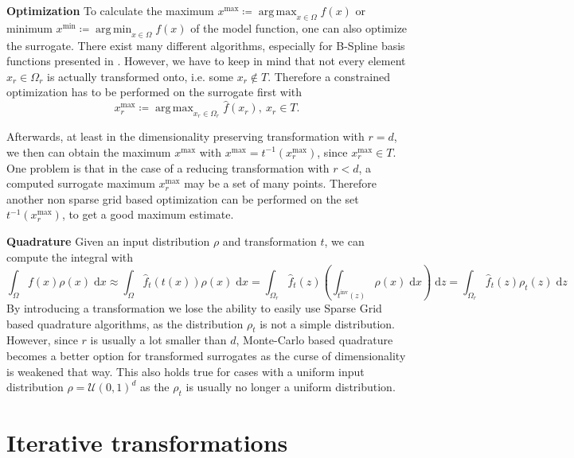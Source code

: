 \documentclass[
  a4paper,  %
  twoside,  %
  bibliography=totoc,
  headsepline,
  cleardoublepage=empty,
  parskip=half,
  draft=false
]{scrbook}
\DeclareMathOperator*{\argmin}{arg\,min}
\DeclareMathOperator*{\argmax}{arg\,max}
\begin{document}
\vspace{1em}
\textbf{Optimization}
To calculate the maximum $x^\text{max} \coloneqq \argmax_{x \in \Omega} f(x)$ or minimum $x^\text{min} \coloneqq \argmin_{x \in \Omega} f(x)$ of the model function, one can also optimize the surrogate. There exist many different algorithms, especially for B-Spline basis functions presented in \cite{}.
However, we have to keep in mind that not every element $x_r \in \Omega_r$ is actually transformed onto, i.e. some $x_r \notin T$.
Therefore a constrained optimization has to be performed on the surrogate first with
\begin{equation}
x_{r}^\text{max} \coloneqq \argmax_{x_r \in \Omega_r} \hat{f}(x_r), ~ x_r \in T.
\end{equation}

Afterwards, at least in the dimensionality preserving transformation with $r=d$, we then can obtain the maximum $x^\text{max}$ with $x^\text{max}=t^{-1}(x_{r}^\text{max})$, since $x_{r}^\text{max} \in T$.
One problem is that in the case of a reducing transformation with $r<d$, a computed surrogate maximum $x_{r}^\text{max}$ may be a set of many points.
Therefore another non sparse grid based optimization can be performed on the set $t^{-1}(x_{r}^\text{max})$, to get a good maximum estimate.

\vspace{1em}
\textbf{Quadrature}
Given an input distribution $\rho$ and transformation $t$, we can compute the integral with
\begin{equation}
\int_{\Omega} f(x) \rho(x) \; \text{d}x \approx \int_{\Omega} \hat{f}_t(t(x)) \rho(x) \; \text{d}x
=
\int_{\Omega_r} \hat{f}_t(z) \left(\int_{t^{\text{inv}}(z)} \rho(x)  \; \text{d}x \right)  \; \text{d}z=
\int_{\Omega_r} \hat{f}_t(z) \rho_t(z) \; \text{d}z
\end{equation}
By introducing a transformation we lose the ability to easily use Sparse Grid based quadrature algorithms, as the distribution $\rho_t$ is not a simple distribution.
However, since $r$ is usually a lot smaller than $d$, Monte-Carlo based quadrature becomes a better option for transformed surrogates as the curse of dimensionality is weakened that way.
This also holds true for cases with a uniform input distribution $\rho=\mathcal{U}(0,1)^d$ as the $\rho_t$ is usually no longer a uniform distribution.


\chapter{Iterative transformations}
\label{chap:c5}
\end{document}
